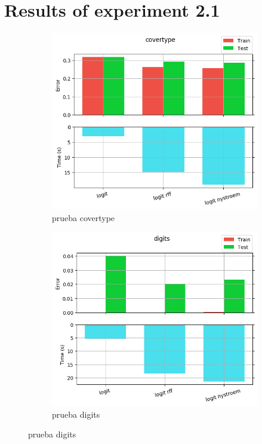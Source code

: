 
\chapter{Results of experiment 2.1} %

\label{Appendix2-1} %


\begin{figure}[ht]
  \centering
  \begin{subfigure}[b]{0.5\linewidth}
    \centering\includegraphics[width=\imgscale\linewidth]{Figures/2_1/covertype}
    \caption{prueba covertype}
    \label{fig:2_1_covertype}
  \end{subfigure}%
  \begin{subfigure}[b]{0.5\linewidth}
    \centering\includegraphics[width=\imgscale\linewidth]{Figures/2_1/digits}
    \caption{prueba digits}
    \label{fig:2_1_digits}
  \end{subfigure}
\end{figure}

